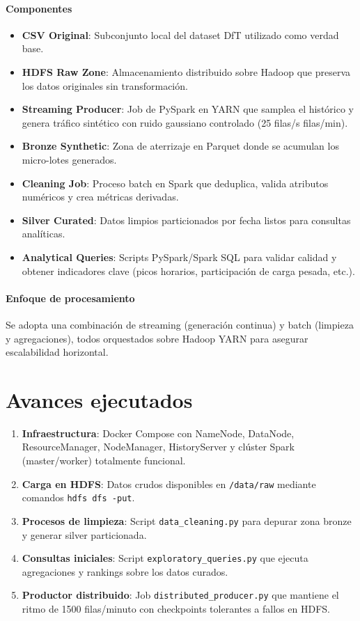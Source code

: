 \documentclass[11pt]{article}
\begin{document}
\paragraph{Componentes}
\begin{itemize}[leftmargin=*]
  \item \textbf{CSV Original}: Subconjunto local del dataset DfT utilizado como verdad base.
  \item \textbf{HDFS Raw Zone}: Almacenamiento distribuido sobre Hadoop que preserva los datos originales sin transformación.
  \item \textbf{Streaming Producer}: Job de PySpark en YARN que samplea el histórico y genera tráfico sintético con ruido gaussiano controlado (25 filas/s  filas/min).
  \item \textbf{Bronze Synthetic}: Zona de aterrizaje en Parquet donde se acumulan los micro-lotes generados.
  \item \textbf{Cleaning Job}: Proceso batch en Spark que deduplica, valida atributos numéricos y crea métricas derivadas.
  \item \textbf{Silver Curated}: Datos limpios particionados por fecha listos para consultas analíticas.
  \item \textbf{Analytical Queries}: Scripts PySpark/Spark SQL para validar calidad y obtener indicadores clave (picos horarios, participación de carga pesada, etc.).
\end{itemize}

\paragraph{Enfoque de procesamiento} Se adopta una combinación de streaming (generación continua) y batch (limpieza y agregaciones), todos orquestados sobre Hadoop YARN para asegurar escalabilidad horizontal.

\section{Avances ejecutados}
\begin{enumerate}[leftmargin=*]
  \item \textbf{Infraestructura}: Docker Compose con NameNode, DataNode, ResourceManager, NodeManager, HistoryServer y clúster Spark (master/worker) totalmente funcional.\checkmark
  \item \textbf{Carga en HDFS}: Datos crudos disponibles en \texttt{/data/raw} mediante comandos \texttt{hdfs dfs -put}.\checkmark
  \item \textbf{Procesos de limpieza}: Script \texttt{data\_cleaning.py} para depurar zona bronze y generar silver particionada.\checkmark
  \item \textbf{Consultas iniciales}: Script \texttt{exploratory\_queries.py} que ejecuta agregaciones y rankings sobre los datos curados.\checkmark
  \item \textbf{Productor distribuido}: Job \texttt{distributed\_producer.py} que mantiene el ritmo de 1500 filas/minuto con checkpoints tolerantes a fallos en HDFS.\checkmark
\end{enumerate}
\end{document}
